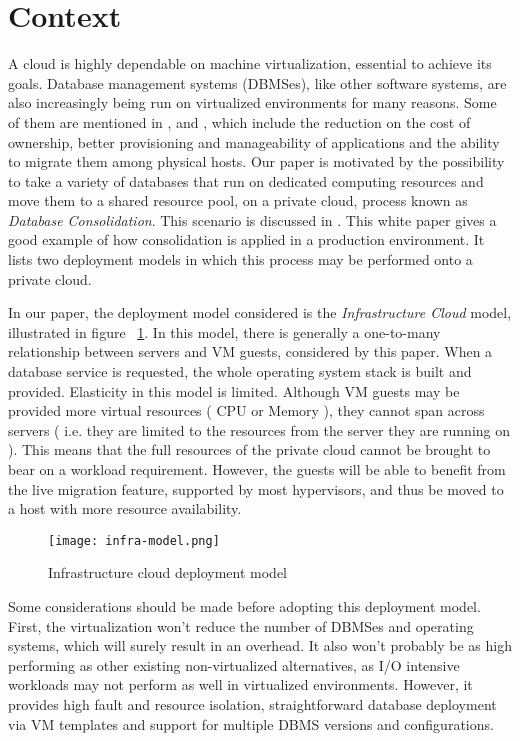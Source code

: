\section{Context}

A cloud is highly dependable on machine virtualization, essential to achieve its goals. Database management systems (DBMSes), like other software systems, are also increasingly being run on virtualized environments for many reasons. Some of them are mentioned in \cite{4498282}, \cite{4401021} and \cite{Soror:2008:AVM:1376616.1376711}, which include the reduction on the cost of ownership, better provisioning and manageability of applications and the ability to migrate them among physical hosts. Our paper is motivated by the possibility to take a variety of databases that run on dedicated computing resources and move them to a shared resource pool, on a private cloud, process known as \textit{Database Consolidation}. This scenario is discussed in \cite{instance1290}. This white paper gives a good example of how consolidation is applied in a production environment. It lists two deployment models in which this process may be performed onto a private cloud. 

In our paper, the deployment model considered is the \textit{Infrastructure Cloud} model, illustrated in figure  ~\ref{fig:infra-model}. In this model, there is generally a one-to-many relationship between servers and VM guests, considered by this paper. When a database service is requested, the whole operating system stack is built and provided. Elasticity in this model is limited. Although VM guests may be provided more virtual resources ( CPU or Memory ), they cannot span across servers ( i.e. they are limited to the resources from the server they are running on ). This means that the full resources of the private cloud cannot be brought to bear on a workload requirement. However, the guests will be able to benefit from the live migration feature, supported by most hypervisors, and thus be moved to a host with more resource availability. 

\begin{figure}[ht]
\centering
\texttt{[image: infra-model.png]}
\caption{Infrastructure cloud deployment model}
\label{fig:infra-model}
\end{figure} 

Some considerations should be made before adopting this deployment model. First, the virtualization won't reduce the number of DBMSes and operating systems, which will surely result in an overhead. It also won't probably be as high performing as other existing non-virtualized alternatives, as I/O intensive workloads may not perform as well in virtualized environments. However, it provides high fault and resource isolation, straightforward database deployment via VM templates and  support for multiple DBMS versions and configurations.


